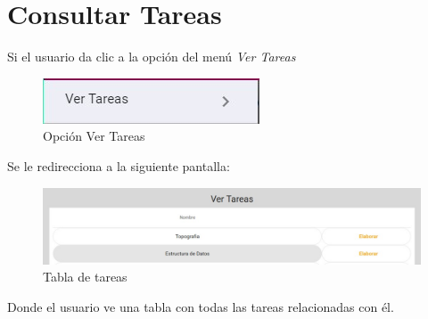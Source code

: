 
\section{Consultar Tareas}

    Si el usuario da clic a la opción del menú \textit{Ver Tareas}
     
    \begin{figure}[H]
            \centering
            \hypertarget{VERT}{\includegraphics[width=0.7\linewidth]{images/Tareas/Vertareaboton}}
            \caption{Opción Ver Tareas}
            \label{VERT}
    \end{figure}

    Se le redirecciona a la siguiente pantalla:
    \begin{figure}[H]
            \centering
            \hypertarget{asignart}{\includegraphics[width=0.7\linewidth]{images/Tareas/Vertareas}}
            \caption{Tabla de tareas}
            \label{asignart}
    \end{figure}
    Donde el usuario ve una tabla con todas las tareas relacionadas con él.